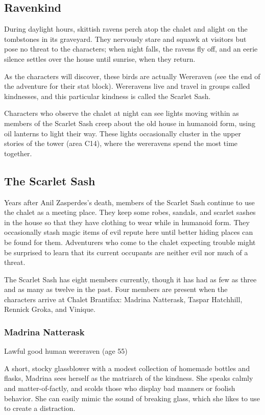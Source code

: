\documentclass[10pt,a4paper,twoside,bg=print,twocolumn,openany,nodeprecatedcode]{dndbook}
\begin{document}
\subsection{Ravenkind}
During daylight hours, skittish ravens perch atop the chalet and alight on the tombstones in its graveyard. They nervously stare and squawk at visitors but pose no threat to the characters; when night falls, the ravens fly off, and an eerie silence settles over the house until sunrise, when they return.

As the characters will discover, these birds are actually Wereraven (see the end of the adventure for their stat block). Wereravens live and travel in groups called kindnesses, and this particular kindness is called the Scarlet Sash.

Characters who observe the chalet at night can see lights moving within as members of the Scarlet Sash creep about the old house in humanoid form, using oil lanterns to light their way. These lights occasionally cluster in the upper stories of the tower (area C14), where the wereravens spend the most time together.

\subsection{The Scarlet Sash}
Years after Anil Zasperdes's death, members of the Scarlet Sash continue to use the chalet as a meeting place. They keep some robes, sandals, and scarlet sashes in the house so that they have clothing to wear while in humanoid form. They occasionally stash magic items of evil repute here until better hiding places can be found for them. Adventurers who come to the chalet expecting trouble might be surprised to learn that its current occupants are neither evil nor much of a threat.

The Scarlet Sash has eight members currently, though it has had as few as three and as many as twelve in the past. Four members are present when the characters arrive at Chalet Brantifax: Madrina Natterask, Taspar Hatchhill, Rennick Groka, and Vinique.

\subsubsection{Madrina Natterask}
Lawful good human wereraven (age 55)

A short, stocky glassblower with a modest collection of homemade bottles and flasks, Madrina sees herself as the matriarch of the kindness. She speaks calmly and matter-of-factly, and scolds those who display bad manners or foolish behavior. She can easily mimic the sound of breaking glass, which she likes to use to create a distraction.
\end{document}
